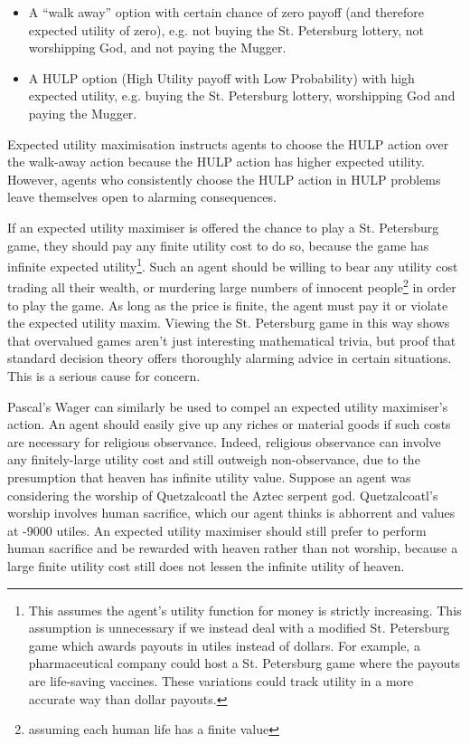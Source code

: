 \documentclass{article}
\begin{document}
\begin{itemize}
\item A ``walk away'' option with certain chance of zero payoff (and therefore expected utility of zero), e.g. not buying the St. Petersburg lottery, not worshipping God, and not paying the Mugger.
\item A HULP option (High Utility payoff with Low Probability) with high expected utility, e.g. buying the St. Petersburg lottery, worshipping God and paying the Mugger.
\end{itemize}

Expected utility maximisation instructs agents to choose the HULP action over the walk-away action because the HULP action has higher expected utility. However, agents who consistently choose the HULP action in HULP problems leave themselves open to alarming consequences.

If an expected utility maximiser is offered the chance to play a St. Petersburg game, they should pay any finite utility cost to do so, because the game has infinite expected utility\footnote{This assumes the agent's utility function for money is strictly increasing. This assumption is unnecessary if we instead deal with a modified St. Petersburg game which awards payouts in utiles instead of dollars. For example, a pharmaceutical company could host a St. Petersburg game where the payouts are life-saving vaccines. These variations could track utility in a more accurate way than dollar payouts.}. Such an agent should be willing to bear any utility cost\textemdash{} trading all their wealth, or murdering large numbers of innocent people\footnote{assuming each human life has a finite value} \textemdash{} in order to play the game. As long as the price is finite, the agent must pay it or violate the expected utility maxim. Viewing the St. Petersburg game in this way shows that overvalued games aren't just interesting mathematical trivia, but proof that standard decision theory offers thoroughly alarming advice in certain situations. This is a serious cause for concern.

Pascal's Wager can similarly be used to compel an expected utility maximiser's action. An agent should easily give up any riches or material goods if such costs are necessary for religious observance. Indeed, religious observance can involve any finitely-large utility cost and still outweigh non-observance, due to the presumption that heaven has infinite utility value. Suppose an agent was considering the worship of Quetzalcoatl the Aztec serpent god. Quetzalcoatl's worship involves human sacrifice, which our agent thinks is abhorrent and values at -9000 utiles. An expected utility maximiser should still prefer to perform human sacrifice and be rewarded with heaven rather than not worship, because a large finite utility cost still does not lessen the infinite utility of heaven. 
\end{document}
